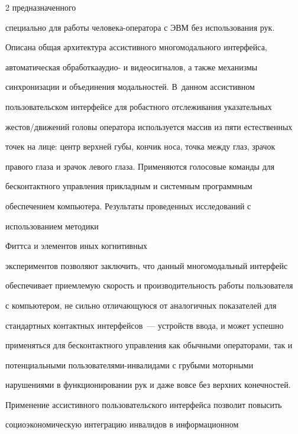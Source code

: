 \begin{multicols}{2}
предназначенного 


специально для работы че\-ло\-ве\-ка-опе\-ра\-то\-ра с ЭВМ без использования рук. 


Опи\-сана общая архитектура ассистивного многомодального интерфейса, 


автоматическая обработка\linebreak аудио- и видеосигналов, а также механизмы 


синхронизации и объединения модальностей. В~данном ассистивном 


пользовательском интерфейсе для робастного отслеживания указательных 


жес\-тов/дви\-же\-ний головы оператора используется массив из пяти естественных 


точек на лице: центр верхней губы, кончик носа, точка между глаз, зрачок 


правого глаза и зрачок левого глаза. Применяются голосовые команды для 


бесконтактного управ\-ле\-ния прикладным и системным про\-грам\-мным 


обеспечением компьютера. Результаты проведенных исследований с 


использованием методики %


 Фиттса и элементов иных когнитивных 


экспериментов позволяют заключить, что данный многомодальный интерфейс 


обеспечивает приемлемую скорость и производительность работы пользователя 


с компьютером, не сильно отличающуюся от аналогичных показателей для 


стандартных контактных интерфейсов~--- устройств ввода, и может успешно 


применяться для бесконтактного управления как обычными операторами, так и 


потенциальными поль\-зо\-ва\-те\-ля\-ми-ин\-ва\-ли\-да\-ми с грубыми моторными 


нарушениями в функционировании рук и даже вовсе без верхних конечностей.


  


  Применение ассистивного пользовательского интерфейса позволит повысить 


социоэкономическую интеграцию инвалидов в информационном\linebreak



\end{multicols}

